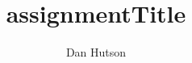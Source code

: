 \documentclass[12pt]{article}
\author{Dan Hutson}
\title{assignmentTitle}
\begin{document}
\maketitle
\begin{center}
\end{center}
\end{document}
